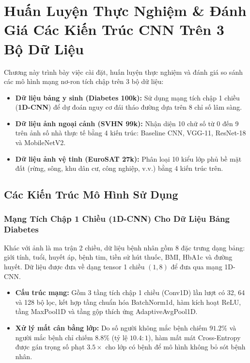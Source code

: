 \documentclass[12pt,a4paper]{report}
\begin{document}
\chapter{Huấn Luyện Thực Nghiệm \& Đánh Giá Các Kiến Trúc CNN Trên 3 Bộ Dữ Liệu}
\label{chap:chapter5_cnn_training_benchmarks}

Chương này trình bày việc cài đặt, huấn luyện thực nghiệm và đánh giá so sánh các mô hình mạng nơ-ron tích chập trên 3 bộ dữ liệu:
\begin{itemize}[leftmargin=*]
    \item \textbf{Dữ liệu bảng y sinh (Diabetes 100k):} Sử dụng mạng tích chập 1 chiều (\textbf{1D-CNN}) để dự đoán nguy cơ đái tháo đường dựa trên 8 chỉ số lâm sàng.
    \item \textbf{Dữ liệu ảnh ngoại cảnh (SVHN 99k):} Nhận diện 10 chữ số từ 0 đến 9 trên ảnh số nhà thực tế bằng 4 kiến trúc: Baseline CNN, VGG-11, ResNet-18 và MobileNetV2.
    \item \textbf{Dữ liệu ảnh vệ tinh (EuroSAT 27k):} Phân loại 10 kiểu lớp phủ bề mặt đất (rừng, sông, khu dân cư, công nghiệp, v.v.) bằng 4 kiến trúc trên.
\end{itemize}

\section{Các Kiến Trúc Mô Hình Sử Dụng}
\label{sec:architecture_specifications}

\subsection{Mạng Tích Chập 1 Chiều (1D-CNN) Cho Dữ Liệu Bảng Diabetes}
Khác với ảnh là ma trận 2 chiều, dữ liệu bệnh nhân gồm 8 đặc trưng dạng bảng: giới tính, tuổi, huyết áp, bệnh tim, tiền sử hút thuốc, BMI, HbA1c và đường huyết. Dữ liệu được đưa về dạng tensor 1 chiều $(1, 8)$ để đưa qua mạng 1D-CNN.
\begin{itemize}[leftmargin=*]
    \item \textbf{Cấu trúc mạng:} Gồm 3 tầng tích chập 1 chiều (Conv1D) lần lượt có 32, 64 và 128 bộ lọc, kết hợp tầng chuẩn hóa BatchNorm1d, hàm kích hoạt ReLU, tầng MaxPool1D và tầng gộp thích ứng AdaptiveAvgPool1D.
    \item \textbf{Xử lý mất cân bằng lớp:} Do số người không mắc bệnh chiếm $91.2\%$ và người mắc bệnh chỉ chiếm $8.8\%$ (tỷ lệ $10.4 : 1$), hàm mất mát Cross-Entropy được gán trọng số phạt $3.5\times$ cho lớp có bệnh để mô hình không bỏ sót bệnh nhân.
\end{itemize}
\end{document}
